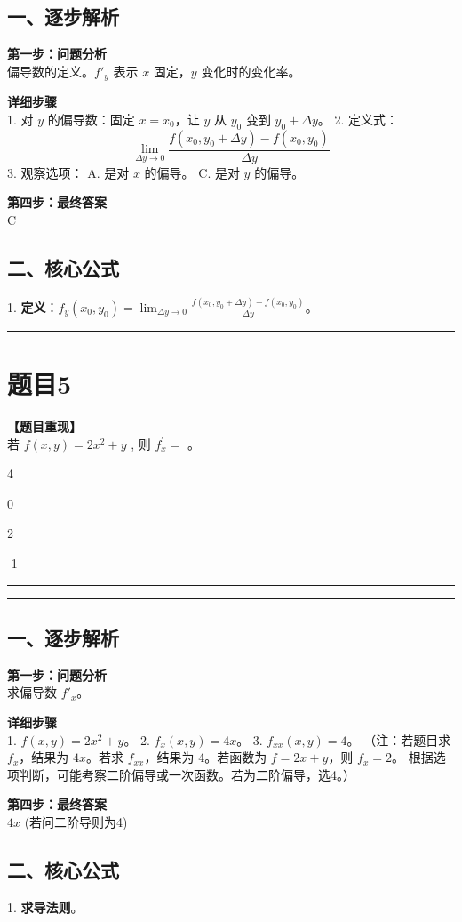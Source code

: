 \documentclass[12pt, a4paper]{ctexart}
\newcommand{\TopSeparator}{
    \par\noindent\rule{\textwidth}{1.5pt}\vspace{0.5em} %
}
\newcommand{\AnalysisSeparator}{
    \par\noindent\rule{\textwidth}{0.5pt}\vspace{0.2em}\hrule\vspace{0.5em} %
}
\newenvironment{RedAnalysis}{
    \par
    \color{red} %
}{
    \par
    \color{black} %
}
\newcommand{\choicesFour}[4]{
    \begin{enumerate}[label=\Alph*., itemsep=0pt, parsep=0pt, topsep=5pt, labelsep=0.5em]
        \begin{minipage}{0.22\linewidth} \item #1 \end{minipage}
        \begin{minipage}{0.22\linewidth} \item #2 \end{minipage}
        \begin{minipage}{0.22\linewidth} \item #3 \end{minipage}
        \begin{minipage}{0.22\linewidth} \item #4 \end{minipage}
    \end{enumerate}
}
\begin{document}
\begin{RedAnalysis}

\subsection*{一、逐步解析}

\textbf{第一步：问题分析} \\
偏导数的定义。$f'_y$ 表示 $x$ 固定，$y$ 变化时的变化率。

\textbf{详细步骤} \\
1. 对 $y$ 的偏导数：固定 $x=x_0$，让 $y$ 从 $y_0$ 变到 $y_0+\Delta y$。
2. 定义式：
   \[ \lim_{\Delta y \to 0} \frac{f(x_0, y_0 + \Delta y) - f(x_0, y_0)}{\Delta y} \]
3. 观察选项：
   A. 是对 $x$ 的偏导。
   C. 是对 $y$ 的偏导。

\textbf{第四步：最终答案} \\
C

\subsection*{二、核心公式}
1. \textbf{定义}：$f_y(x_0,y_0) = \lim_{\Delta y \to 0} \frac{f(x_0, y_0+\Delta y)-f(x_0,y_0)}{\Delta y}$。

\end{RedAnalysis}

\vspace{2em}

\TopSeparator
\section*{题目5}

\textbf{【题目重现】} \\
若 $ f(x,y)=2x^{2}+y $ , 则 $ f_{x}^{'}= $ \underline{\hspace{1cm}}。
\choicesFour{4}{0}{2}{-1}

\AnalysisSeparator

\begin{RedAnalysis}

\subsection*{一、逐步解析}

\textbf{第一步：问题分析} \\
求偏导数 $f'_x$。

\textbf{详细步骤} \\
1. $f(x,y) = 2x^2 + y$。
2. $f_x(x,y) = 4x$。
3. $f_{xx}(x,y) = 4$。
   （注：若题目求 $f_x$，结果为 $4x$。若求 $f_{xx}$，结果为 4。若函数为 $f=2x+y$，则 $f_x=2$。
   根据选项判断，可能考察二阶偏导或一次函数。若为二阶偏导，选4。）

\textbf{第四步：最终答案} \\
$4x$ (若问二阶导则为4)

\subsection*{二、核心公式}
1. \textbf{求导法则}。

\end{RedAnalysis}
\end{document}
